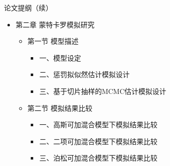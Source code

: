 \documentclass[ignorenonframetext,11pt,xcolor=dvipsnames,aspectratio=1610,hyperref={bookmarksdepth=4}]{beamer}
\providecommand{\tightlist}{%
  \setlength{\itemsep}{0pt}\setlength{\parskip}{0pt}}
\begin{document}
\begin{frame}{论文提纲（续）}

\begin{itemize}
\tightlist
\item
  第二章 蒙特卡罗模拟研究

  \begin{itemize}
  \tightlist
  \item
    第一节 模型描述

    \begin{itemize}
    \tightlist
    \item
      一、模型设定
    \item
      二、惩罚拟似然估计模拟设计
    \item
      三、基于切片抽样的MCMC估计模拟设计
    \end{itemize}
  \item
    第二节 模拟结果比较

    \begin{itemize}
    \tightlist
    \item
      一、高斯可加混合模型下模拟结果比较
    \item
      二、二项可加混合模型下模拟结果比较
    \item
      三、泊松可加混合模型下模拟结果比较
    \end{itemize}
  \end{itemize}
\end{itemize}

\end{frame}
\end{document}
